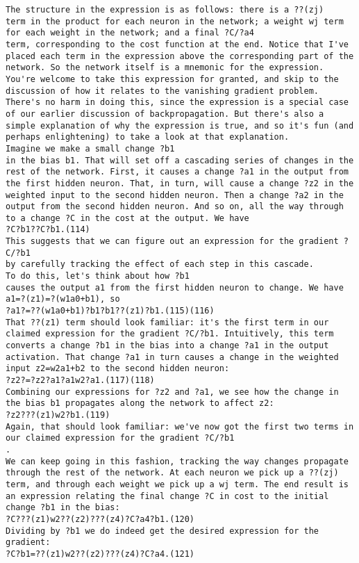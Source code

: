 \begin{lstlisting}
The structure in the expression is as follows: there is a ??(zj)
term in the product for each neuron in the network; a weight wj term for each weight in the network; and a final ?C/?a4
term, corresponding to the cost function at the end. Notice that I've placed each term in the expression above the corresponding part of the network. So the network itself is a mnemonic for the expression.
You're welcome to take this expression for granted, and skip to the discussion of how it relates to the vanishing gradient problem. There's no harm in doing this, since the expression is a special case of our earlier discussion of backpropagation. But there's also a simple explanation of why the expression is true, and so it's fun (and perhaps enlightening) to take a look at that explanation.
Imagine we make a small change ?b1
in the bias b1. That will set off a cascading series of changes in the rest of the network. First, it causes a change ?a1 in the output from the first hidden neuron. That, in turn, will cause a change ?z2 in the weighted input to the second hidden neuron. Then a change ?a2 in the output from the second hidden neuron. And so on, all the way through to a change ?C in the cost at the output. We have 
?C?b1??C?b1.(114)
This suggests that we can figure out an expression for the gradient ?C/?b1
by carefully tracking the effect of each step in this cascade.
To do this, let's think about how ?b1
causes the output a1 from the first hidden neuron to change. We have a1=?(z1)=?(w1a0+b1), so 
?a1?=??(w1a0+b1)?b1?b1??(z1)?b1.(115)(116)
That ??(z1) term should look familiar: it's the first term in our claimed expression for the gradient ?C/?b1. Intuitively, this term converts a change ?b1 in the bias into a change ?a1 in the output activation. That change ?a1 in turn causes a change in the weighted input z2=w2a1+b2 to the second hidden neuron: 
?z2?=?z2?a1?a1w2?a1.(117)(118)
Combining our expressions for ?z2 and ?a1, we see how the change in the bias b1 propagates along the network to affect z2: 
?z2???(z1)w2?b1.(119)
Again, that should look familiar: we've now got the first two terms in our claimed expression for the gradient ?C/?b1
.
We can keep going in this fashion, tracking the way changes propagate through the rest of the network. At each neuron we pick up a ??(zj)
term, and through each weight we pick up a wj term. The end result is an expression relating the final change ?C in cost to the initial change ?b1 in the bias: 
?C???(z1)w2??(z2)???(z4)?C?a4?b1.(120)
Dividing by ?b1 we do indeed get the desired expression for the gradient: 
?C?b1=??(z1)w2??(z2)???(z4)?C?a4.(121)

\end{lstlisting}

